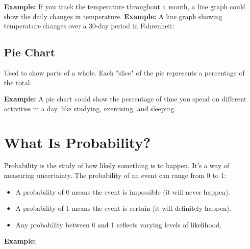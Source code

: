\textbf{Example:} If you track the temperature throughout a month, a line graph could show the daily changes in temperature.
\textbf{Example:} A line graph showing temperature changes over a 30-day period in Fahrenheit:
\begin{center}
\end{center}

\subsection{Pie Chart}
Used to show parts of a whole. Each "slice" of the pie represents a percentage of the total.

\textbf{Example:} A pie chart could show the percentage of time you spend on different activities in a day, like studying, exercising, and sleeping.

\section{What Is Probability?}
Probability is the study of how likely something is to happen. It’s a way of measuring uncertainty. The probability of an event can range from 0 to 1:

\begin{itemize}
    \item A probability of 0 means the event is impossible (it will never happen).
    \item A probability of 1 means the event is certain (it will definitely happen).
    \item Any probability between 0 and 1 reflects varying levels of likelihood.
\end{itemize}

\textbf{Example:}

